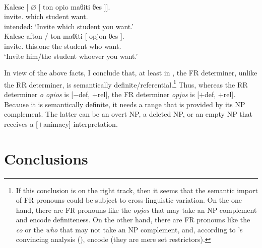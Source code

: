 \documentclass[output=paper]{langsci/langscibook}
\begin{document}
\ea {}\label{ex:01.30}\\
    \gll    \llap{*}Kalese [ ${\varnothing}$ [ {ton opio} maθiti θes ]].\\
            invite.\Ssg{} {} {} {} which student want.\Ssg{}\\
    \trans intended: \enquote*{Invite which student you want.}
\ex {}\label{ex:01.31}\\
    \gll    \llap{*}Kalese afton / ton maθiti [ opjon θes ].\\
            invite.\Ssg{} this.one {} the student {} who want.\Ssg{}\\
    \trans  *\enquote*{Invite him/the student whoever you want.}
\z

In view of the above facts, I conclude that, at least in , the
\gls{FR} determiner, unlike the \gls{RR} determiner, is semantically
definite/referential.\footnote{ If this conclusion is on the right track, then
    it seems that the semantic import of \gls{FR} pronouns could be subject to
    cross-linguistic variation. On the one hand, there are \gls{FR} pronouns
    like the  \emph{opjos} that may take an NP complement and encode
    definiteness. On the other hand, there are \gls{FR} pronouns like the
     \emph{co} or the  \emph{who} that may not take an NP
    complement, and, according to \citeauthor{Caponigro2003}’s convincing
    analysis (\citeyear{Caponigro2003}),
    encode  (they are mere set restrictors).} Thus, whereas the \gls{RR}
    determiner \emph{o opios} is [$-$def, $+$rel], the \gls{FR} determiner
    \emph{opjos} is [$+$def, $+$rel]. Because it is semantically definite, it
    needs a range that is provided by its NP complement. The latter can be an
    overt NP, a deleted NP, or an empty NP that receives a [$\pm$animacy]
    interpretation.

\section{Conclusions}\label{sec:01.5}\largerpage
\end{document}
